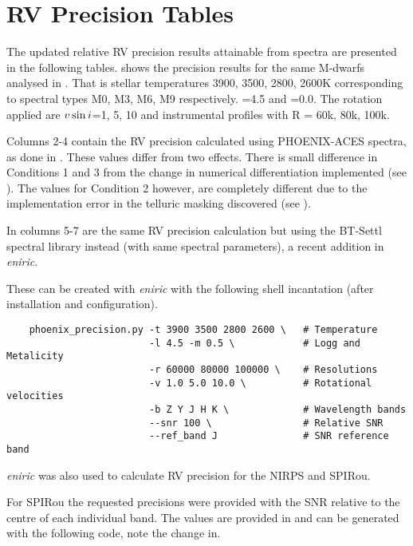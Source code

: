 
\chapter{RV Precision Tables} %

\label{app:nir_prec_amendment}

The updated relative RV precision results attainable from \nir{} spectra are presented in the following tables.  shows the precision results for the same M-dwarfs analysed in \citep{figueira_radial_2016}.
That is stellar temperatures 3900, 3500, 2800, 2600K corresponding to spectral types M0, M3, M6, M9 respectively. \logg{}=4.5 and \feh{}=0.0. The rotation applied are $v\sin{i}{}$=1, 5, 10\kmps{} and instrumental profiles with R = 60k, 80k, 100k.

Columns 2-4 contain the RV precision calculated using {PHOENIX-ACES} spectra, as done in \citet{figueira_radial_2016}. These values differ from two effects. There is small difference in Conditions 1 and 3 from the change in numerical differentiation implemented (see ). The values for Condition 2 however, are completely different due to the implementation error in the telluric masking discovered (see ). 

In columns 5-7 are the same RV precision calculation but using the {BT-Settl} spectral library instead (with same spectral parameters), a recent addition in \emph{eniric}.


These can be created with \emph{eniric} with the following shell incantation (after installation and configuration).


\begin{lstlisting}
    phoenix_precision.py -t 3900 3500 2800 2600 \   # Temperature
                         -l 4.5 -m 0.5 \            # Logg and Metalicity
                         -r 60000 80000 100000 \    # Resolutions
                         -v 1.0 5.0 10.0 \          # Rotational velocities
                         -b Z Y J H K \             # Wavelength bands
                         --snr 100 \                # Relative SNR
                         --ref_band J               # SNR reference band
\end{lstlisting}


\emph{eniric} was also used to calculate {RV} precision for the {NIRPS} and {SPIRou}. 

For {SPIRou} the requested precisions were provided with the SNR relative to the centre of each individual band. The values are provided in  and can be generated with the following code, note the change in.


